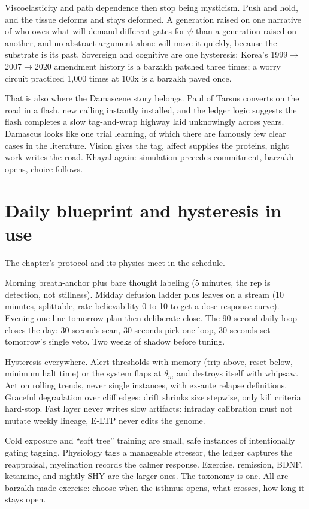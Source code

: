 Viscoelasticity and path dependence then stop being mysticism. Push and hold, and the tissue deforms and stays deformed. A generation raised on one narrative of who owes what will demand different gates for $\psi$ than a generation raised on another, and no abstract argument alone will move it quickly, because the substrate is its past. Sovereign and cognitive are one hysteresis: Korea's 1999$\to$2007$\to$2020 amendment history is a barzakh patched three times; a worry circuit practiced 1,000 times at 100x is a barzakh paved once.

That is also where the Damascene story belongs. Paul of Tarsus converts on the road in a flash, new calling instantly installed, and the ledger logic suggests the flash completes a slow tag-and-wrap highway laid unknowingly across years. Damascus looks like one trial learning, of which there are famously few clear cases in the literature. Vision gives the tag, affect supplies the proteins, night work writes the road. Khayal again: simulation precedes commitment, barzakh opens, choice follows.

\section{Daily blueprint and hysteresis in use}

The chapter's protocol and its physics meet in the schedule.

Morning breath-anchor plus bare thought labeling (5 minutes, the rep is detection, not stillness). Midday defusion ladder plus leaves on a stream (10 minutes, splittable, rate believability 0 to 10 to get a dose-response curve). Evening one-line tomorrow-plan then deliberate close. The 90-second daily loop closes the day: 30 seconds scan, 30 seconds pick one loop, 30 seconds set tomorrow's single veto. Two weeks of shadow before tuning.

Hysteresis everywhere. Alert thresholds with memory (trip above, reset below, minimum halt time) or the system flaps at $\theta_m$ and destroys itself with whipsaw. Act on rolling trends, never single instances, with ex-ante relapse definitions. Graceful degradation over cliff edges: drift shrinks size stepwise, only kill criteria hard-stop. Fast layer never writes slow artifacts: intraday calibration must not mutate weekly lineage, E-LTP never edits the genome.

Cold exposure and ``soft tree'' training are small, safe instances of intentionally gating tagging. Physiology tags a manageable stressor, the ledger captures the reappraisal, myelination records the calmer response. Exercise, remission, BDNF, ketamine, and nightly SHY are the larger ones. The taxonomy is one. All are barzakh made exercise: choose when the isthmus opens, what crosses, how long it stays open.

